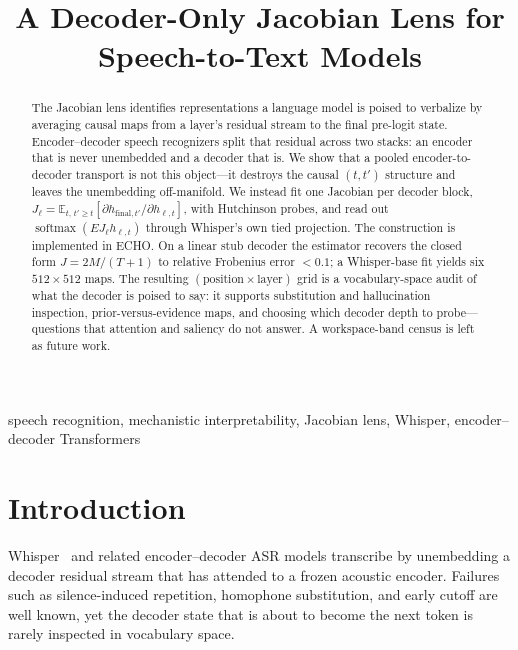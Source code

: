 \documentclass[conference]{IEEEtran}
\begin{document}
\title{A Decoder-Only Jacobian Lens for Speech-to-Text Models}

\author{
}

\maketitle

\begin{abstract}
The Jacobian lens identifies representations a language model is poised to verbalize by averaging causal maps from a layer's residual stream to the final pre-logit state. Encoder--decoder speech recognizers split that residual across two stacks: an encoder that is never unembedded and a decoder that is. We show that a pooled encoder-to-decoder transport is not this object---it destroys the causal \((t,t')\) structure and leaves the unembedding off-manifold. We instead fit one Jacobian per decoder block,
\(J_\ell=\mathbb{E}_{t,\,t'\ge t}[\partial h_{\mathrm{final},t'}/\partial h_{\ell,t}]\),
with Hutchinson probes, and read out \(\operatorname{softmax}(E J_\ell h_{\ell,t})\) through Whisper's own tied projection. The construction is implemented in ECHO. On a linear stub decoder the estimator recovers the closed form \(J=2M/(T+1)\) to relative Frobenius error \(<0.1\); a Whisper-base fit yields six \(512\times 512\) maps. The resulting \((\text{position}\times\text{layer})\) grid is a vocabulary-space audit of what the decoder is poised to say: it supports substitution and hallucination inspection, prior-versus-evidence maps, and choosing which decoder depth to probe---questions that attention and saliency do not answer. A workspace-band census is left as future work.
\end{abstract}

\begin{IEEEkeywords}
speech recognition, mechanistic interpretability, Jacobian lens, Whisper, encoder--decoder Transformers
\end{IEEEkeywords}

\section{Introduction}

Whisper~\cite{radford2023whisper} and related encoder--decoder ASR models transcribe by unembedding a decoder residual stream that has attended to a frozen acoustic encoder. Failures such as silence-induced repetition, homophone substitution, and early cutoff are well known, yet the decoder state that is about to become the next token is rarely inspected in vocabulary space.
\end{document}
